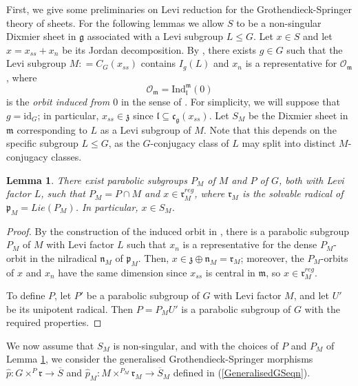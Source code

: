 \documentclass{amsart}
\newtheorem{lemma}[theorem]{Lemma}
\theoremstyle{remark}
\numberwithin{theorem}{section}
\numberwithin{equation}{section}
\begin{document}
First, we give some preliminaries on Levi reduction for the Grothendieck-Springer theory of sheets. For the following lemmas we allow $S$ to be a non-singular Dixmier sheet in $\mathfrak{g}$ associated with a Levi subgroup $L \leq G$. Let $x \in S$ and let $x = x_{ss}+x_n$ be its Jordan decomposition. By \cite[Satz 4.8]{Borho2}, there exists $g \in G$ such that the Levi subgroup $M: = C_G(x_{ss})$ contains $I_g(L)$ and $x_n$ is a representative for $\mathcal O_{\mathfrak{m}}$, where
\begin{equation}\label{InducedOrbiteqn}
        \mathcal O_{\mathfrak{m}} = \text{Ind}_{\mathfrak{l}}^{\mathfrak{m}}(0)
    \end{equation}
is the \emph{orbit induced from $0$} in the sense of \cite[Theorem 1.3]{LS}. For simplicity, we will suppose that $g =\text{id}_G$; in particular, $x_{ss} \in \mathfrak{z}$ since $\mathfrak{l} \subseteq \mathfrak{c}_{\mathfrak{g}}(x_{ss})$. Let $S_M$ be the Dixmier sheet in $\mathfrak{m}$ corresponding to $L$ as a Levi subgroup of $M$. Note that this depends on the specific subgroup $L \leq G$, as the $G$-conjugacy class of $L$ may split into distinct $M$-conjugacy classes. 

\begin{lemma}\label{SheetsLIlem}
    There exist parabolic subgroups $P_M$ of $M$ and $P$ of $G$, both with Levi factor $L$, such that $P_M = P \cap M$ and $x \in \mathfrak{r}_M^{reg}$, where $\mathfrak{r}_M$ is the solvable radical of $\mathfrak{p}_M = Lie(P_M)$. In particular, $x \in S_M$.
\end{lemma}

\begin{proof}
By the construction of the induced orbit in \cite{LS}, there is a parabolic subgroup $P_M$ of $M$ with Levi factor $L$ such that $x_n$ is a representative for the dense $P_M$-orbit in the nilradical $\mathfrak{n}_M$ of $\mathfrak{p}_M$. Then, $x \in \mathfrak{z} \oplus \mathfrak{n}_M = \mathfrak{r}_M$; moreover, the $P_M$-orbits of $x$ and $x_n$ have the same dimension since $x_{ss}$ is central in $\mathfrak{m}$, so $x \in \mathfrak{r}_M^{reg}$.

To define $P$, let $P'$ be a parabolic subgroup of $G$ with Levi factor $M$, and let $U'$ be its unipotent radical. Then $P = P_MU'$ is a parabolic subgroup of $G$ with the required properties.
\end{proof}

We now assume that $S_M$ is non-singular, and with the choices of $P$ and $P_M$ of Lemma \ref{SheetsLIlem}, we consider the generalised Grothendieck-Springer morphisms $\hat{p}:G \times^P \mathfrak{r} \rightarrow \overline{S}$ and $\hat{p}_M:M \times^{P_M} \mathfrak{r}_M \rightarrow \overline{S}_M$ defined in (\ref{GeneralisedGSeqn}).
\end{document}
